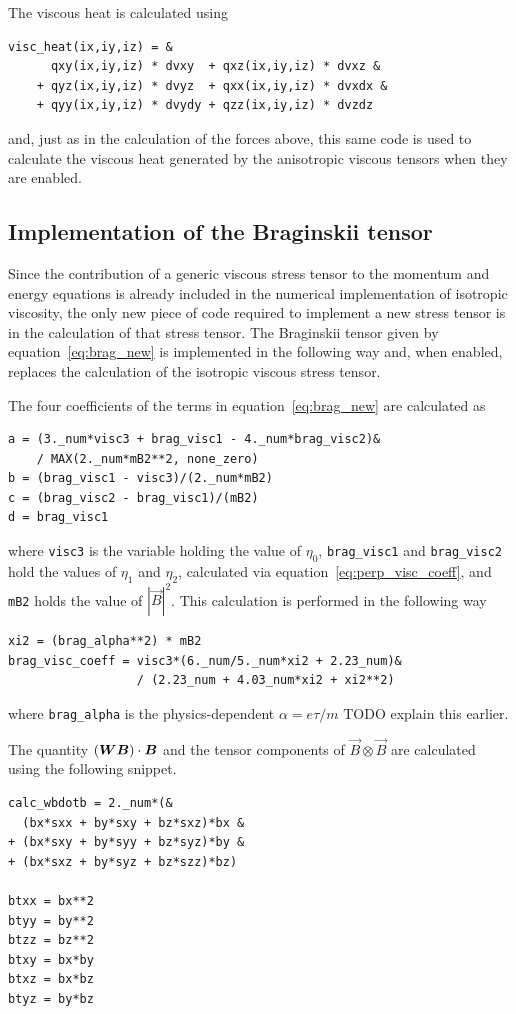 The viscous heat is calculated using
\begin{verbatim}
visc_heat(ix,iy,iz) = &
      qxy(ix,iy,iz) * dvxy  + qxz(ix,iy,iz) * dvxz &
    + qyz(ix,iy,iz) * dvyz  + qxx(ix,iy,iz) * dvxdx &
    + qyy(ix,iy,iz) * dvydy + qzz(ix,iy,iz) * dvzdz
\end{verbatim}
and, just as in the calculation of the forces above, this same code is used to calculate the viscous heat generated by the anisotropic viscous tensors when they are enabled.

\subsection{Implementation of the Braginskii tensor}

Since the contribution of a generic viscous stress tensor to the momentum and energy equations is already included in the numerical implementation of isotropic viscosity, the only new piece of code required to implement a new stress tensor is in the calculation of that stress tensor. The Braginskii tensor given by equation~\ref{eq:brag_new} is implemented in the following way and, when enabled, replaces the calculation of the isotropic viscous stress tensor. 

The four coefficients of the terms in equation~\ref{eq:brag_new} are calculated as
\begin{verbatim}
a = (3._num*visc3 + brag_visc1 - 4._num*brag_visc2)&
    / MAX(2._num*mB2**2, none_zero)
b = (brag_visc1 - visc3)/(2._num*mB2)
c = (brag_visc2 - brag_visc1)/(mB2)
d = brag_visc1
\end{verbatim}
where \verb|visc3| is the variable holding the value of $\eta_0$, \verb|brag_visc1| and \verb|brag_visc2| hold the values of $\eta_1$ and $\eta_2$, calculated via equation~\ref{eq:perp_visc_coeff}, and \verb|mB2| holds the value of $|\vec{B}|^2$. This calculation is performed in the following way
\begin{verbatim}
xi2 = (brag_alpha**2) * mB2
brag_visc_coeff = visc3*(6._num/5._num*xi2 + 2.23_num)&
                  / (2.23_num + 4.03_num*xi2 + xi2**2)
\end{verbatim}
where \verb|brag_alpha| is the physics-dependent $\alpha = e \tau / m$ TODO explain this earlier.

The quantity $({\bm W} {\bm B}) \cdot {\bm B}$ and the tensor components of $\vec{B} \otimes \vec{B}$ are calculated using the following snippet.
\begin{verbatim}
calc_wbdotb = 2._num*(&
  (bx*sxx + by*sxy + bz*sxz)*bx &
+ (bx*sxy + by*syy + bz*syz)*by &
+ (bx*sxz + by*syz + bz*szz)*bz)

btxx = bx**2
btyy = by**2
btzz = bz**2
btxy = bx*by
btxz = bx*bz
btyz = by*bz
\end{verbatim}

